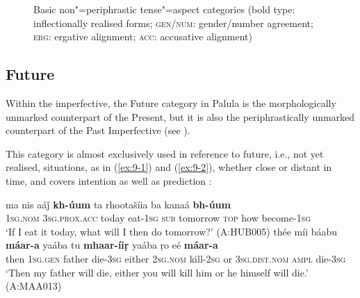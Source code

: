 \begin{figure}[ht]
\centering
{}
\caption{Basic non"=periphrastic tense"=aspect categories (bold type: inflectionally realised forms;
    \textsc{gen/num}: gender/number agreement; \textsc{erg}: ergative alignment; \textsc{acc}:
    accusative alignment)}
\label{fig:9-1}
\end{figure}

\subsection{Future}
\label{subsec:9-1-2}


Within the imperfective, the Future category in Palula is the morphologically unmarked counterpart of the Present, but it is also the periphrastically unmarked counterpart of the Past Imperfective (see ). 



This category is almost exclusively used in reference to future, i.e., not yet realised, situations, as in (\ref{ex:9-1}) and (\ref{ex:9-2}), whether close or distant in time, and covers intention as well as prediction \citep[105--108]{dahl1985}:


\begin{exe}
\ex
\label{ex:9-1}
\gll ma nis aáǰ \textbf{kh-úum} ta rhootašíia ba kanaá \textbf{bh-úum}\\
\textsc{1sg.nom} \textsc{3}\textsc{sg.prox.acc} today eat-\textsc{1sg} \textsc{sub} tomorrow \textsc{top} how become-\textsc{1sg}\\
\glt `If I eat it today, what will I then do tomorrow?' (A:HUB005)
\ex
\label{ex:9-2}
\gll thée míi báabu \textbf{máar-a} yaába tu \textbf{mhaar-íiṛ} yaába ṛo eé \textbf{máar-a} \\
then \textsc{1sg.gen} father die-\textsc{3sg} either \textsc{2sg.nom} kill-\textsc{2sg}  or \textsc{3sg.dist.nom} \textsc{ampl} die-\textsc{3sg}  \\
\glt `Then my father will die, either you will kill him or he himself will die.' (A:MAA013)
\end{exe}

